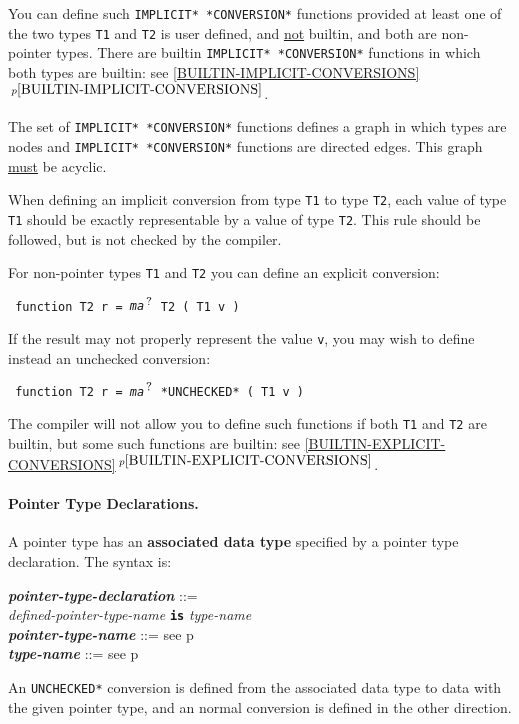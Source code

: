 \documentclass[12pt]{article}
\newcommand{\subsubsubsection}[1]{\paragraph[#1]{#1.}}
\newcommand{\TT}[1]{{\tt \bfseries #1}}
\newcommand{\QMARK}{{$^{\,\mbox{\footnotesize ?}}$}}
\newcommand{\key}[1]{{\rm \bfseries #1}}
\newcommand{\ttkey}[1]{{\tt \bfseries #1}}
\newcommand{\emkey}[1]{{\em \bfseries #1}}
\newcommand{\itemref}[1]{\ref{#1}$\,^{p\pageref{#1}}$}
\newcommand{\pagref}[1]{p\pageref{#1}}
\newenvironment{indpar}[1][0.3in]%
	{\begin{list}{}%
		     {\setlength{\itemsep}{0in}%
		      \setlength{\topsep}{0in}%
		      \setlength{\parsep}{1ex}%
		      \setlength{\labelwidth}{#1}%
		      \setlength{\leftmargin}{#1}%
		      \addtolength{\leftmargin}{\labelsep}}%
	 \item}%
	{\end{list}}
\begin{document}
You can define such {\tt *IMPLICIT* *CONVERSION*} functions
provided at least one of the two types {\tt T1} and {\tt T2}
is user defined, and \underline{not} builtin, and both are
non-pointer types.
There are builtin {\tt *IMPLICIT* *CON\-VER\-SION*} functions in
which both types are builtin: see \itemref{BUILTIN-IMPLICIT-CONVERSIONS}.

The set of {\tt *IMPLICIT* *CONVERSION*} functions defines
a graph in which types are nodes and {\tt *IMPLICIT* *CONVERSION*}
functions are directed edges.  This graph \underline{must} be
acyclic.

When defining an implicit conversion from type {\tt T1} to type
{\tt T2}, each value of type {\tt T1} should be exactly representable
by a value of type {\tt T2}.  This rule should be followed, but
is not checked by the compiler.

For non-pointer types {\tt T1} and {\tt T2} you
can define an explicit conversion:
\begin{indpar} \tt
function T2 r = {\em ma}\QMARK{} T2 ( T1 v )
\end{indpar}
If the result may not properly represent the value {\tt v}, you
may wish to define instead an unchecked conversion:
\begin{indpar} \tt
function T2 r = {\em ma}\QMARK{} *UNCHECKED* ( T1 v )
\end{indpar}
The compiler will not allow you to define such functions if both
{\tt T1} and {\tt T2} are builtin, but some such functions are
builtin: see \itemref{BUILTIN-EXPLICIT-CONVERSIONS}.





\subsubsubsection{Pointer Type Declarations}
\label{POINTER-TYPE-DECLARATIONS}

A pointer type has an
\key{associated data type}\label{POINTER-ASSOCIATE}
specified by a pointer type declaration.  The syntax is:

\begin{indpar}
\emkey{pointer-type-declaration}\label{POINTER-TYPE-DECLARATION} ::= \\
\hspace*{0.5in}\ttkey{pointer type} {\em defined-pointer-type-name}
	       \TT{is} {\em type-name}
\\[0.5ex]
\emkey{pointer-type-name} ::= see \pagref{POINTER-TYPE-NAME}
\\[0.5ex]
\emkey{type-name} ::= see \pagref{TYPE-NAME}
\end{indpar}
An {\tt *UNCHECKED*} conversion is defined from the associated data
type to data with the given pointer type, and an normal conversion
is defined in the other direction.
\end{document}
